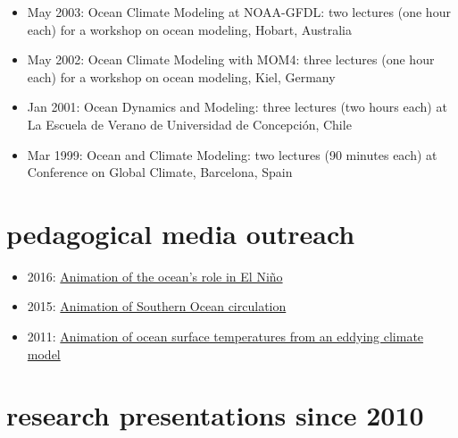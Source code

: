 \documentclass{article}
\begin{document}
\begin{itemize}[leftmargin=*]
\item May 2003: {\sc Ocean Climate Modeling at NOAA-GFDL}: two lectures (one hour each) for a workshop on ocean modeling, Hobart, Australia

\item May 2002: {\sc Ocean Climate Modeling with MOM4}: three lectures (one hour each) for a workshop on ocean modeling, Kiel, Germany

\item Jan 2001: {\sc Ocean Dynamics and Modeling}: three lectures (two hours each) at La Escuela de Verano de Universidad de Concepci\'on, Chile

\item Mar 1999: {\sc Ocean and Climate Modeling}: two lectures (90 minutes each) at {\sc Conference on Global Climate}, Barcelona,
Spain

\end{itemize}



\section*{\sc  \color{Maroon} pedagogical media outreach}
\vspace{-.3cm}

\begin{itemize}[leftmargin=*]

\item 2016: \href{https://www.youtube.com/watch?v=gaFjlZxM7S4&feature=youtu.be}{Animation of  the ocean's role in El Ni\~{n}o} 

\item 2015:  \href{https://www.youtube.com/watch?v=8VMSF28J9H4&list=PL9poquLHLLO91iC_6pujn6bsMCvMyJ3xU}{Animation  of  Southern Ocean circulation} 

\item 2011:  \href{https://vimeo.com/27076776}{Animation  of  ocean surface temperatures from an eddying climate model} 

\end{itemize}



\section*{\sc \color{Maroon} research presentations since 2010}
\vspace{-.3cm}
\end{document}
